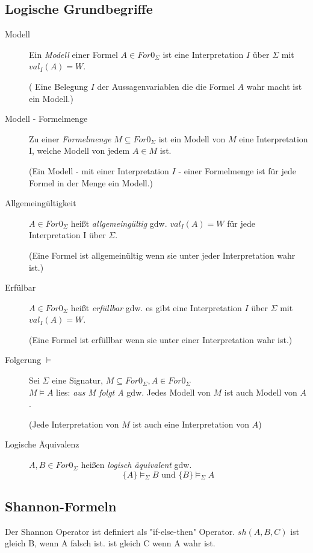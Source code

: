 \documentclass{article}
\begin{document}
\subsection{Logische Grundbegriffe}
\begin{description}
    \item[Modell] Ein \textit{Modell} einer Formel $A \in For0_\Sigma$ ist eine Interpretation $I$ \"uber $\Sigma$ mit $val_I(A) = W$.

    ( Eine Belegung $I$ der Aussagenvariablen die die Formel $A$ wahr macht ist ein Modell.)

\item[Modell - Formelmenge] Zu einer \textit{Formelmenge} $M \subseteq For0_\Sigma$ ist ein Modell von $M$ eine Interpretation I, welche Modell von jedem $A \in M$ ist. 
    
    (Ein Modell - mit einer Interpretation $I$ - einer Formelmenge ist f\"ur jede Formel in der Menge ein Modell.)

\item[Allgemeing\"ultigkeit]
    $A \in For0_\Sigma$ hei{\ss}t \textit{allgemeing\"ultig} gdw. 
    $val_I(A) = W$ f\"ur jede Interpretation I \"uber $\Sigma$.

    (Eine Formel ist allgemein\"ultig wenn sie unter jeder Interpretation wahr ist.)

\item[Erf\"ulbar]
    $A \in For0_\Sigma$ hei{\ss}t \textit{erf\"ullbar} gdw.
    es gibt eine Interpretation $I$ \"uber $\Sigma$ mit $val_I(A) = W$.

    (Eine Formel ist erf\"ullbar wenn sie unter einer Interpretation wahr ist.)

\item[Folgerung $\models$]
    Sei $\Sigma$ eine Signatur, $M \subseteq For0_\Sigma, A \in For0_\Sigma$ \\
    $M \models A$ lies: \textit{aus M folgt A} gdw.
    Jedes Modell von $M$ ist auch Modell von $A$.

    (Jede Interpretation von $M$ ist auch eine Interpretation von $A$)

\item[Logische \"Aquivalenz]
    $A, B \in For0_\Sigma$ hei{\ss}en \textit{logisch \"aquivalent} gdw.
    \[ \{ A\} \models_\Sigma B \text{ und } \{B\} \models_\Sigma A \]
\end{description}
\subsection{Shannon-Formeln}
Der Shannon Operator ist definiert als "if-else-then" Operator.
$sh(A, B, C)$
ist gleich B, wenn A falsch ist. ist gleich C wenn A wahr ist.
\end{document}
